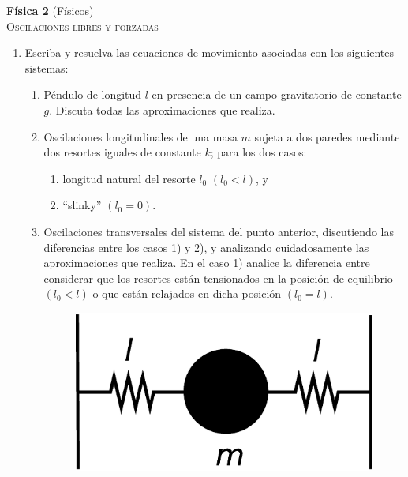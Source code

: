 \documentclass[11pt,spanish,a4paper]{article}
\begin{document}
\begin{center}
\textbf{Física 2} (Físicos) \hfill {}\\
	\textsc{\LARGE Oscilaciones libres y forzadas}
\end{center}


\begin{enumerate}

\section*{Oscilador armónico de un único grado de libertad}

\item Escriba y resuelva las ecuaciones de movimiento asociadas con los
siguientes sistemas: 
\begin{enumerate}
\item Péndulo de longitud $l$ en presencia de un campo gravitatorio de
constante $g$. Discuta todas las aproximaciones que realiza.
\item Oscilaciones longitudinales de una masa $m$ sujeta a dos paredes
mediante dos resortes iguales de constante $k$; para los dos casos: 

\begin{enumerate}
\item longitud natural del resorte $l_{0}$ $(l_{0}<l)$, y 
\item ``slinky'' $(l_{0}=0)$. 
\end{enumerate}
\item Oscilaciones transversales del sistema del punto anterior, discutiendo
las diferencias entre los casos 1) y 2), y analizando cuidadosamente
las aproximaciones que realiza. En el caso 1) analice la diferencia
entre considerar que los resortes están tensionados en la posición
de equilibrio $(l_{0}<l)$ o que están relajados en dicha posición
$(l_{0}=l)$.
\begin{figure}[H]
\centering{}\includegraphics[clip,scale=0.25]{ej1-1}
\end{figure}


\end{enumerate}
\end{enumerate}
\end{document}
